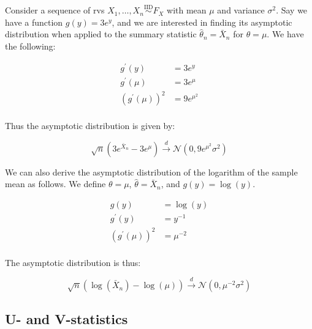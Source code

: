 \documentclass{report}
\begin{document}
Consider a sequence of \glspl{rv} $X_1, \dots, X_n \overset{\text{IID}}{\sim} F_X$ with mean $\mu$ and variance $\sigma^2$. Say we have a function $g(y) = 3e^y$, and we are interested in finding its asymptotic distribution when applied to the summary statistic $\hat{\theta}_n= \bar{X}_n$ for $\theta = \mu$. We have the following:

\begin{equation}\label{eq:ex-lst-delta-method-exp-1}
    \begin{aligned}
        g^\prime(y) &= 3e^y \\
        g^\prime(\mu) &= 3e^\mu \\
        \left(g^\prime(\mu)\right)^2 &= 9e^{\mu^2} \\
    \end{aligned}
\end{equation}

Thus the asymptotic distribution is given by:

\begin{equation}\label{eq:ex-lst-delta-method-exp-2}
    \sqrt{n}\left(3e^{\bar{X}_n} - 3e^\mu\right) \overset{d}{\to} \mathcal{N}\left(0, 9e^{\mu^2}\sigma^2\right)
\end{equation}

We can also derive the asymptotic distribution of the logarithm of the sample mean as follows. We define $\theta = \mu$, $\hat{\theta} = \bar{X}_n$, and $g(y) = \log(y)$. 

\begin{equation}\label{eq:ex-lst-delta-method-log-1}
    \begin{aligned}
      g(y) &= \log(y) \\
      g^\prime(y) &= y^{-1} \\
      \left(g^\prime(\mu)\right)^2 &= \mu^{-2} \\
    \end{aligned}
\end{equation}

The asymptotic distribution is thus:

\begin{equation}\label{eq:ex-lst-delta-method-log-2}
\sqrt{n}\left(\log\left(\bar{X}_n\right) - \log(\mu)\right) \overset{d}{\to} \mathcal{N}(0, \mu^{-2}\sigma^2)
\end{equation}

\subsection{U- and V-statistics}
\end{document}
